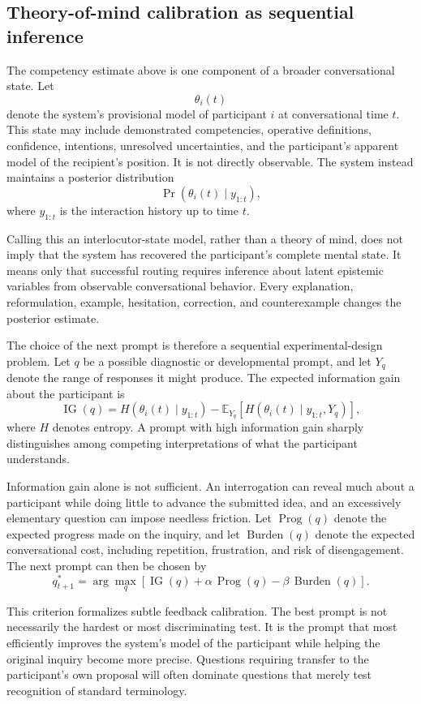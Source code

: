 \documentclass[11pt]{article}
\begin{document}
\subsection{Theory-of-mind calibration as sequential inference}

The competency estimate above is one component of a broader conversational state. Let
\[
\theta_i(t)
\]
denote the system's provisional model of participant $i$ at conversational time $t$. This state may include demonstrated competencies, operative definitions, confidence, intentions, unresolved uncertainties, and the participant's apparent model of the recipient's position. It is not directly observable. The system instead maintains a posterior distribution
\[
\Pr\!\left(\theta_i(t) \mid y_{1:t}\right),
\]
where $y_{1:t}$ is the interaction history up to time $t$.

Calling this an interlocutor-state model, rather than a theory of mind, does not imply that the system has recovered the participant's complete mental state. It means only that successful routing requires inference about latent epistemic variables from observable conversational behavior. Every explanation, reformulation, example, hesitation, correction, and counterexample changes the posterior estimate.

The choice of the next prompt is therefore a sequential experimental-design problem. Let $q$ be a possible diagnostic or developmental prompt, and let $Y_q$ denote the range of responses it might produce. The expected information gain about the participant is
\[
\operatorname{IG}(q)
=
H\!\left(\theta_i(t)\mid y_{1:t}\right)
-
\mathbb{E}_{Y_q}
\left[
H\!\left(\theta_i(t)\mid y_{1:t},Y_q\right)
\right],
\]
where $H$ denotes entropy. A prompt with high information gain sharply distinguishes among competing interpretations of what the participant understands.

Information gain alone is not sufficient. An interrogation can reveal much about a participant while doing little to advance the submitted idea, and an excessively elementary question can impose needless friction. Let $\operatorname{Prog}(q)$ denote the expected progress made on the inquiry, and let $\operatorname{Burden}(q)$ denote the expected conversational cost, including repetition, frustration, and risk of disengagement. The next prompt can then be chosen by
\[
q_{t+1}^{*}
=
\arg\max_q
\left[
\operatorname{IG}(q)
+
\alpha\,\operatorname{Prog}(q)
-
\beta\,\operatorname{Burden}(q)
\right].
\]

This criterion formalizes subtle feedback calibration. The best prompt is not necessarily the hardest or most discriminating test. It is the prompt that most efficiently improves the system's model of the participant while helping the original inquiry become more precise. Questions requiring transfer to the participant's own proposal will often dominate questions that merely test recognition of standard terminology.
\end{document}
